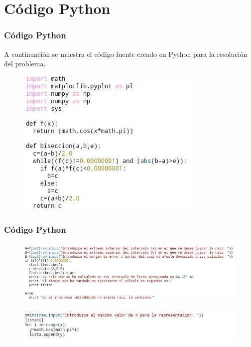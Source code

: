 \documentclass{beamer}
\begin{document}
\section{Código Python}

\begin{frame}
\frametitle{Código \textsf{Python}}
A continuación se muestra el código fuente creado en \textsf{Python} para la resolución del problema.

\begin{figure}[b]
\begin{center}
\includegraphics[scale=0.75]{python1.jpeg}
\end{center}
\end{figure}
\end{frame}

\begin{frame}
\frametitle{Código \textsf{Python}}

\begin{figure}[b]
\begin{center}
\includegraphics[scale=0.6]{python2.jpeg}
\end{center}
\end{figure}
\begin{figure}[b]
\begin{center}
\includegraphics[scale=0.7]{python3.jpeg}
\end{center}
\end{figure}
\end{frame}
\end{document}
